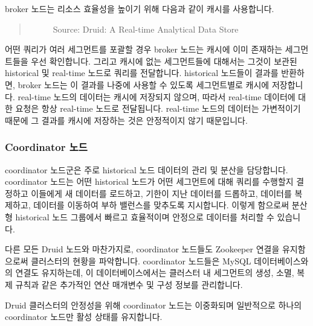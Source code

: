 \documentclass[letterpaper,10pt,english]{sphinxmanual}
\begin{document}
broker 노드는 리소스 효율성을 높이기 위해 다음과 같이 캐시를 사용합니다.
\begin{quote}

\begin{figure}[H]
\centering
\capstart

\noindent{}
\caption{Source: Druid: A Real-time Analytical Data Store}\label{\detokenize{discovery/part01/druid_nodes:id7}}\end{figure}
\end{quote}

어떤 쿼리가 여러 세그먼트를 포괄할 경우 broker 노드는 캐시에 이미 존재하는 세그먼트들을 우선 확인합니다. 그리고 캐시에 없는 세그먼트들에 대해서는 그것이 보관된 historical 및 real-time 노드로 쿼리를 전달합니다. historical 노드들이 결과를 반환하면, broker 노드는 이 결과를 나중에 사용할 수 있도록 세그먼트별로 캐시에 저장합니다. real-time 노드의 데이터는 캐시에 저장되지 않으며, 따라서 real-time 데이터에 대한 요청은 항상 real-time 노드로 전달됩니다. real-time 노드의 데이터는 가변적이기 때문에 그 결과를 캐시에 저장하는 것은 안정적이지 않기 때문입니다.


\subsubsection{Coordinator 노드}
\label{\detokenize{discovery/part01/druid_nodes:coordinator}}\label{\detokenize{discovery/part01/druid_nodes:id1}}
coordinator 노드군은 주로 historical 노드 데이터의 관리 및 분산을 담당합니다. coordinator 노드는 어떤 historical 노드가 어떤 세그먼트에 대해 쿼리를 수행할지 결정하고 이들에게 새 데이터를 로드하고, 기한이 지난 데이터를 드롭하고, 데이터를 복제하고, 데이터를 이동하여 부하 밸런스를 맞추도록 지시합니다. 이렇게 함으로써 분산형 historical 노드 그룹에서 빠르고 효율적이며 안정으로 데이터를 처리할 수 있습니다.

다른 모든 Druid 노드와 마찬가지로, coordinator 노드들도 Zookeeper 연결을 유지함으로써 클러스터의 현황을 파악합니다. coordinator 노드들은 MySQL 데이터베이스와의 연결도 유지하는데, 이 데이터베이스에서는 클러스터 내 세그먼트의 생성, 소멸, 복제 규칙과 같은 추가적인 연산 매개변수 및 구성 정보를 관리합니다.

Druid 클러스터의 안정성을 위해 coordinator 노드는 이중화되며 일반적으로 하나의 coordinator 노드만 활성 상태를 유지합니다.
\end{document}
